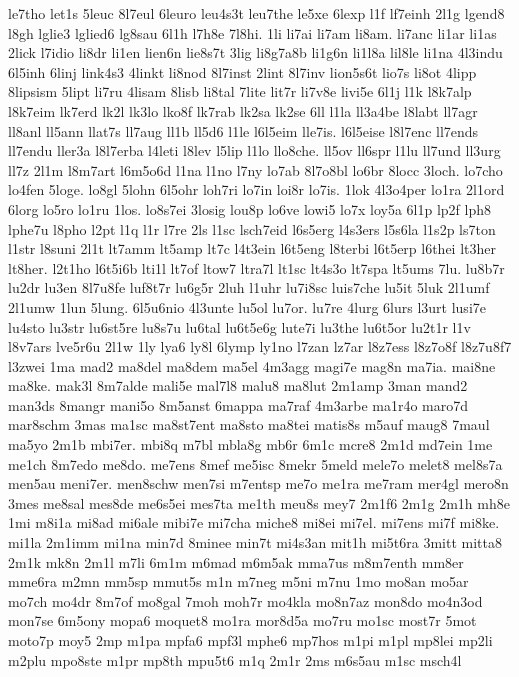 {le7tho
let1s
5leuc
8l7eul
6leuro
leu4s3t
leu7the
le5xe
6lexp
l1f
lf7einh
2l1g
lgend8
l8gh
lglie3
lglied6
lg8sau
6l1h
l7h8e
7l8hi.
1li
li7ai
li7am
li8am.
li7anc
li1ar
li1as
2lick
l7idio
li8dr
li1en
lien6n
lie8s7t
3lig
li8g7a8b
li1g6n
li1l8a
lil8le
li1na
4l3indu
6l5inh
6linj
link4s3
4linkt
li8nod
8l7inst
2lint
8l7inv
lion5s6t
lio7s
li8ot
4lipp
8lipsism
5lipt
li7ru
4lisam
8lisb
li8tal
7lite
lit7r
li7v8e
livi5e
6l1j
l1k
l8k7alp
l8k7eim
lk7erd
lk2l
lk3lo
lko8f
lk7rab
lk2sa
lk2se
6ll
l1la
ll3a4be
l8labt
ll7agr
ll8anl
ll5ann
llat7s
ll7aug
ll1b
ll5d6
l1le
l6l5eim
lle7is.
l6l5eise
l8l7enc
ll7ends
ll7endu
ller3a
l8l7erba
l4leti
l8lev
l5lip
l1lo
llo8che.
ll5ov
ll6spr
l1lu
ll7und
ll3urg
ll7z
2l1m
l8m7art
l6m5o6d
l1na
l1no
l7ny
lo7ab
8l7o8bl
lo6br
8locc
3loch.
lo7cho
lo4fen
5loge.
lo8gl
5lohn
6l5ohr
loh7ri
lo7in
loi8r
lo7is.
1lok
4l3o4per
lo1ra
2l1ord
6lorg
lo5ro
lo1ru
1los.
lo8s7ei
3losig
lou8p
lo6ve
lowi5
lo7x
loy5a
6l1p
lp2f
lph8
lphe7u
l8pho
l2pt
l1q
l1r
l7re
2ls
l1sc
lsch7eid
l6s5erg
l4s3ers
l5s6la
l1s2p
ls7ton
l1str
l8suni
2l1t
lt7amm
lt5amp
lt7c
l4t3ein
l6t5eng
l8terbi
l6t5erp
l6thei
lt3her
lt8her.
l2t1ho
l6t5i6b
lti1l
lt7of
ltow7
ltra7l
lt1sc
lt4s3o
lt7spa
lt5ums
7lu.
lu8b7r
lu2dr
lu3en
8l7u8fe
luf8t7r
lu6g5r
2luh
l1uhr
lu7i8sc
luis7che
lu5it
5luk
2l1umf
2l1umw
1lun
5lung.
6l5u6nio
4l3unte
lu5ol
lu7or.
lu7re
4lurg
6lurs
l3urt
lusi7e
lu4sto
lu3str
lu6st5re
lu8s7u
lu6tal
lu6t5e6g
lute7i
lu3the
lu6t5or
lu2t1r
l1v
l8v7ars
lve5r6u
2l1w
1ly
lya6
ly8l
6lymp
ly1no
l7zan
lz7ar
l8z7ess
l8z7o8f
l8z7u8f7
l3zwei
1ma
mad2
ma8del
ma8dem
ma5el
4m3agg
magi7e
mag8n
ma7ia.
mai8ne
ma8ke.
mak3l
8m7alde
mali5e
mal7l8
malu8
ma8lut
2m1amp
3man
mand2
man3ds
8mangr
mani5o
8m5anst
6mappa
ma7raf
4m3arbe
ma1r4o
maro7d
mar8schm
3mas
ma1sc
ma8st7ent
ma8sto
ma8tei
matis8s
m5auf
maug8
7maul
ma5yo
2m1b
mbi7er.
mbi8q
m7bl
mbla8g
mb6r
6m1c
mcre8
2m1d
md7ein
1me
me1ch
8m7edo
me8do.
me7ens
8mef
me5isc
8mekr
5meld
mele7o
melet8
mel8s7a
men5au
meni7er.
men8schw
men7si
m7entsp
me7o
me1ra
me7ram
mer4gl
mero8n
3mes
me8sal
mes8de
me6s5ei
mes7ta
me1th
meu8s
mey7
2m1f6
2m1g
2m1h
mh8e
1mi
m8i1a
mi8ad
mi6ale
mibi7e
mi7cha
miche8
mi8ei
mi7el.
mi7ens
mi7f
mi8ke.
mi1la
2m1imm
mi1na
min7d
8minee
min7t
mi4s3an
mit1h
mi5t6ra
3mitt
mitta8
2m1k
mk8n
2m1l
m7li
6m1m
m6mad
m6m5ak
mma7us
m8m7enth
mm8er
mme6ra
m2mn
mm5sp
mmut5s
m1n
m7neg
m5ni
m7nu
1mo
mo8an
mo5ar
mo7ch
mo4dr
8m7of
mo8gal
7moh
moh7r
mo4kla
mo8n7az
mon8do
mo4n3od
mon7se
6m5ony
mopa6
moquet8
mo1ra
mor8d5a
mo7ru
mo1sc
most7r
5mot
moto7p
moy5
2mp
m1pa
mpfa6
mpf3l
mphe6
mp7hos
m1pi
m1pl
mp8lei
mp2li
m2plu
mpo8ste
m1pr
mp8th
mpu5t6
m1q
2m1r
2ms
m6s5au
m1sc
msch4l
}
